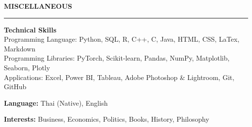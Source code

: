 \documentclass[11pt]{article}
\begin{document}




\vspace{9pt}
\textbf{MISCELLANEOUS}
\vspace{5pt}
{\color{NavyBlue}\hrule}
\vspace{6pt}

\textbf{Technical Skills}\\
\hspace*{7pt} Programming Language: Python, SQL, R, C++, C, Java, HTML, CSS, LaTex, Markdown\\
\hspace*{7pt} Programming Libraries: PyTorch, Scikit-learn, Pandas, NumPy, Matplotlib, Seaborn, Plotly\\
\hspace*{7pt} Applications: Excel, Power BI, Tableau, Adobe Photoshop \& Lightroom, Git, GitHub

\textbf{Language:} Thai (Native), English

\textbf{Interests:} Business, Economics, Politics, Books, History, Philosophy
\end{document}
